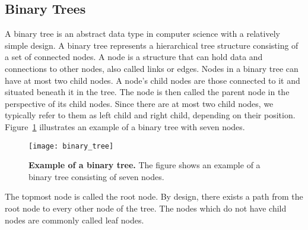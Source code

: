 
%


\subsection{Binary Trees}
A binary tree is an abstract data type in computer science with a relatively simple design. A binary tree represents a hierarchical tree structure consisting of a set of connected nodes. A node is a structure that can hold data and connections to other nodes, also called links or edges. Nodes in a binary tree can have at most two child nodes. A node's child nodes are those connected to it and situated beneath it in the tree. The node is then called the parent node in the perspective of its child nodes. Since there are at most two child nodes, we typically refer to them as left child and right child, depending on their position. Figure~\ref{fig:binary_tree_illustration} illustrates an example of a binary tree with seven nodes.
\begin{figure}[!ht]
\centering
\texttt{[image: binary\_tree]}
\caption[Example of a binary tree]{
  \textbf{Example of a binary tree.}
  The figure shows an example of a binary tree consisting of seven nodes.
}
\label{fig:binary_tree_illustration}
\end{figure}
The topmost node is called the root node. By design, there exists a path from the root node to every other node of the tree. The nodes which do not have child nodes are commonly called leaf nodes.

